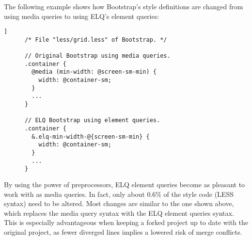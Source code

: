 \documentclass{acm_proc_article-sp}
\newcommand{\code}[1]{\texttt{#1}}
\newcommand{\elq}{ELQ}
\newcommand{\gls}[1]{#1}
\begin{document}
    The following example shows how Bootstrap's style definitions are changed from using media queries to using \elq{}'s element queries:
    \begin{lstlisting}[gobble=6,label={code:bootstrap-less-breakpoints-usage},caption={},captionpos=b]]
      /* File "less/grid.less" of Bootstrap. */

      // Original Bootstrap using media queries.
      .container {
        @media (min-width: @screen-sm-min) {
          width: @container-sm;
        }
        ...
      }

      // ELQ Bootstrap using element queries.
      .container {
        &.elq-min-width-@{screen-sm-min} {
          width: @container-sm;
        }
        ...
      }
    \end{lstlisting}

    By using the power of preprocessors, \gls{ELQ} element queries become as pleasant to work with as \gls{media queries}.
    In fact, only about 0.6\% of the style code (LESS syntax) need to be altered.
    Most changes are similar to the one shown above, which replaces the media query syntax with the \gls{ELQ} element queries syntax.
    This is especially advantageous when keeping a forked project up to date with the original project, as fewer diverged lines implies a lowered risk of merge conflicts.

\end{document}
